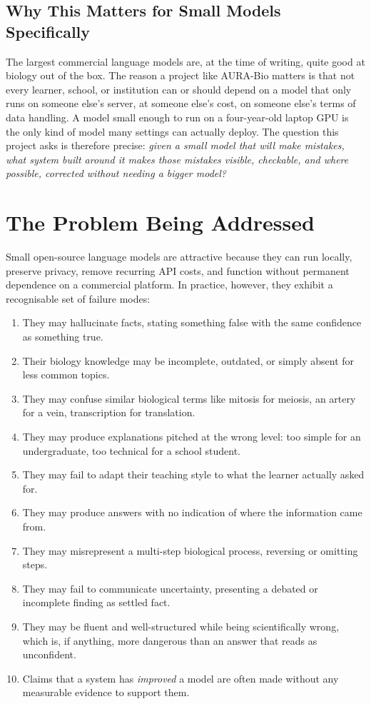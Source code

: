 \subsection{Why This Matters for Small Models Specifically}\label{1.1.2}

The largest commercial language models are, at the time of writing, quite
good at biology out of the box. The reason a project like AURA-Bio matters
is that not every learner, school, or institution can or should depend on a
model that only runs on someone else's server, at someone else's cost, on
someone else's terms of data handling. A model small enough to run on a
four-year-old laptop GPU is the only kind of model many settings can
actually deploy. The question this project asks is therefore precise:
\emph{given a small model that will make mistakes, what system built around
it makes those mistakes visible, checkable, and where possible, corrected
without needing a bigger model?}

\section{The Problem Being Addressed}\label{1.2}

Small open-source language models are attractive because they can run
locally, preserve privacy, remove recurring API costs, and function without
permanent dependence on a commercial platform. In practice, however, they
exhibit a recognisable set of failure modes:

\begin{enumerate}
    \item They may hallucinate facts, stating something false with the same
        confidence as something true.
    \item Their biology knowledge may be incomplete, outdated, or simply
        absent for less common topics.
    \item They may confuse similar biological terms like mitosis for meiosis,
        an artery for a vein, transcription for translation.
    \item They may produce explanations pitched at the wrong level: too
        simple for an undergraduate, too technical for a school student.
    \item They may fail to adapt their teaching style to what the learner
        actually asked for.
    \item They may produce answers with no indication of where the
        information came from.
    \item They may misrepresent a multi-step biological process, reversing
        or omitting steps.
    \item They may fail to communicate uncertainty, presenting a debated or
        incomplete finding as settled fact.
    \item They may be fluent and well-structured while being scientifically
        wrong, which is, if anything, more dangerous than an answer that
        reads as unconfident.
    \item Claims that a system has \emph{improved} a model are often made
        without any measurable evidence to support them.
\end{enumerate}

